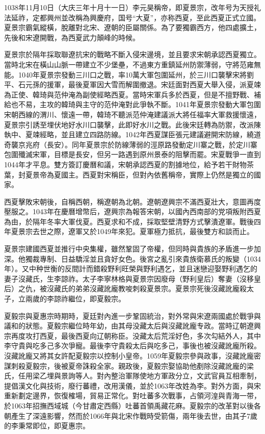 1038年11月10日（大庆三年十月十一日）李元昊稱帝，即夏景宗，改年号为天授礼法延祚，定都興州並改稱為興慶府，国号“大夏”，亦称西夏，至此西夏正式立國。夏景宗霸氣縱橫，脫離對北宋、遼朝的臣屬關係。為了要獨霸西方，他四處擴土，先後和宋遼開戰，為西夏武力顛峰的時候。

夏景宗於隔年採取聯遼抗宋的戰略不斷入侵宋邊境，並且要求宋朝承認西夏獨立。當時北宋在橫山山脈一帶建立不少堡壘，不過東方重鎮延州防禦薄弱，守將范雍無能。1040年夏景宗發動三川口之戰，率10萬大軍包圍延州，於三川口襲擊宋將劉平、石元孫的援軍，最後夏軍因大雪而解圍撤退。宋廷面對西夏大舉入侵，派夏竦為正使、韓琦與范仲淹為副使經略西夏。當時宋軍兵多於西夏，但是不擅野戰、補給也不易，主攻的韓琦與主守的范仲淹對此爭執不斷。1041年夏景宗發動大軍包圍宋朝西線的渭川、懷遠一帶，韓琦不聽派范仲淹建議派大將任福率大軍救援懷遠，夏景宗引誘至埋伏地好水川口襲擊，此即好水川之戰。此後宋廷轉為防禦，改派陳執中、夏竦經略，並且建立四路防線。1042年西夏謀臣張元建議避開宋防線，繞道奇襲京兆府（長安）。同年夏景宗於防線薄弱的涇原路發動定川寨之戰，於定川寨包圍殲滅宋軍，目標是長安，但另一路遇到原州景泰的阻擊而罷。宋夏戰爭一直到1044年才平息。雙方簽訂慶曆和議，宋朝承認西夏的割據地位，給予若干財物茶葉，封夏景帝為夏國主。西夏對宋稱臣，但對內依舊稱帝，實際上仍然是獨立的國家。

西夏擊敗宋朝後，自稱西朝，稱遼朝為北朝。遼朝遼興宗不滿西夏壯大，意圖再度壓服之。1043年在慶曆增幣后，遼興宗為報答宋朝，以國內西南部的党項叛附西夏為由，於隔年冬率大軍伐夏。西夏求和不成，採取堅壁清野方式擊潰遼軍。戰後四年夏景宗去世之際，遼軍又於1049年來犯。夏軍極力抵抗，最後雙方和談而止。

夏景宗建國西夏並推行中央集權，雖然鞏固了帝權，但同時與貴族的矛盾進一步加深。他獨裁專制、日益驕淫並且貪好女色。後宮之亂引來貴族衛慕氏的叛變（1034年）。又中种世衡的反間計而錯殺野利旺榮與野利遇乞，並且迷戀迎娶野利遇乞的妻子沒藏氏，生李諒祚。太子李寧林格與夏景宗因廢母（野利皇后）奪妻（沒移皇后）之仇，被沒藏氏的弟弟沒藏訛龐教唆刺殺夏景宗。夏景宗死後沒藏訛龐殺太子，立兩歲的李諒祚繼位，即夏毅宗。

夏毅宗與夏惠宗時期時，夏廷對內進一步鞏固統治，對外常與宋遼兩國處於戰爭與議和的狀態。夏毅宗繼位時年幼，由其母没藏太后與沒藏訛龐专政。當時辽朝遼興宗再度攻打西夏，最後西夏向辽朝称臣。没藏太后荒淫好色，多次勾結外人，其中李守貴與吃多己多次爭寵。最後李守貴殺太后與吃多己，事後也被沒藏訛龐所殺。沒藏訛龐又將其女許配夏毅宗以控制小皇帝。1059年夏毅宗參與政事，沒藏訛龐密謀刺殺夏毅宗，後被夏帝誅殺全家。親政後，夏毅宗娶協助他剷除沒藏訛龐的梁氏，任用梁乙埋與景詢等人。對內整治軍隊使地方軍政分立，文武官員互相牽制，提倡漢文化與技術，廢行蕃禮，改用漢儀，並於1063年改姓為李。對外方面，與宋重新劃定邊界，恢復榷場，貿易正常化。對吐蕃多次戰事，占領河湟與青海一带，於1063年招撫西域城（今甘肅定西縣）吐蕃首領禹藏花麻。夏毅宗的改革對以後各朝產生了深遠影響，然而於1066年與北宋作戰時受箭傷，兩年後去世，由其子7歲的李秉常即位，即夏惠宗。


